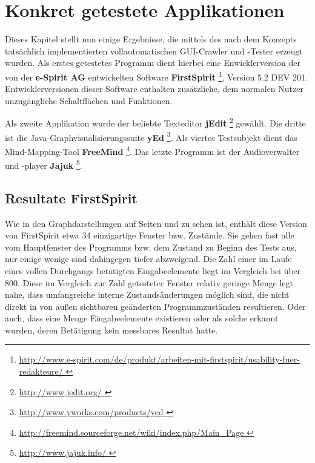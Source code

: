 \chapter{Konkret getestete Applikationen}\label{chapter:concretetests}


Dieses Kapitel stellt nun einige Ergebnisse, die mittels des nach dem Konzepts tatsächlich
implementierten vollautomatischen GUI-Crawler und -Tester erzeugt wurden.
Als erstes getestetes Programm dient hierbei eine Enwicklerversion der von der
\textbf{e-Spirit AG} entwickelten Software \textbf{FirstSpirit} 
\footnote{\url{ http://www.e-spirit.com/de/produkt/arbeiten-mit-firstspirit/usability-fuer-redakteure/ }},
Version 5.2 DEV 201. Entwicklerversionen dieser Software enthalten zusätzliche,
dem normalen Nutzer unzugängliche Schaltflächen und Funktionen.

Als zweite Applikation wurde der beliebte Texteditor \textbf{jEdit}
\footnote{\url{ http://www.jedit.org/ }} gewählt. Die dritte ist
die Java-Graphvisualisierungssuite \textbf{yEd}
\footnote{\url{ http://www.yworks.com/products/yed }}.
Als viertes Testsubjekt dient das \glqq{}Mind-Mapping\grqq{}-Tool \textbf{FreeMind}
\footnote{\url{ http://freemind.sourceforge.net/wiki/index.php/Main_Page }}.
Das letzte Programm ist der Audioverwalter und -player \textbf{Jajuk}
\footnote{\url{ http://www.jajuk.info/ }}.



\section{Resultate FirstSpirit}\label{section:testresults}

Wie in den Graphdarstellungen auf Seiten \pageref{fig:model_firstspirit_notext} und 
\pageref{fig:model_freespirit_06.10.2015} zu sehen ist, enthält diese Version von
FirstSpirit etwa 34 einzigartige Fenster bzw. Zustände. Sie gehen fast alle vom
Hauptfenster des Programms bzw. dem Zustand zu Beginn des Tests aus,
nur einige wenige sind dahingegen tiefer abzweigend. Die Zahl einer im
Laufe eines vollen Durchgangs betätigten Eingabeelemente liegt im Vergleich bei
über 800. Diese im Vergleich zur Zahl getesteter Fenster relativ geringe 
Menge legt nahe, dass umfangreiche interne Zustandsänderungen
möglich sind, die nicht direkt in von außen sichtbaren geänderten
Programmzuständen resultieren. Oder auch, dass eine Menge Eingabeelemente
existieren oder als solche erkannt wurden, deren Betätigung kein messbares
Resultat hatte.

